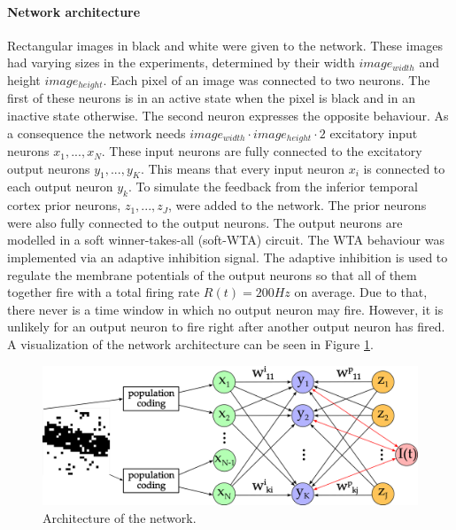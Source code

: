 \paragraph{Network architecture}
Rectangular images in black and white were given to the network. These images had varying sizes in the experiments, determined by their width $image_{width}$ and height $image_{height}$. Each pixel of an image was connected to two neurons. The first of these neurons is in an active state when the pixel is black and in an inactive state otherwise. The second neuron expresses the opposite behaviour. As a consequence the network needs $image_{width} \cdot image_{height} \cdot 2$ excitatory input neurons $x_1,...,x_N$. These input neurons are fully connected to the excitatory output neurons $y_1,...,y_K$. This means that every input neuron $x_i$ is connected to each output neuron $y_k$. 
To simulate the feedback from the inferior temporal cortex prior neurons, $z_1,...,z_J$, were added to the network. The prior neurons were also fully connected to the output neurons. The output neurons are modelled in a soft winner-takes-all (soft-WTA) circuit. The WTA behaviour was implemented via an adaptive inhibition signal. The adaptive inhibition is used to regulate the membrane potentials of the output neurons so that all of them together fire with a total firing rate $R(t) = 200 Hz$ on average. Due to that, there never is a time window in which no output neuron may fire. However, it is unlikely for an output neuron to fire right after another output neuron has fired. A visualization of the network architecture can be seen in Figure \ref{fig:networkArchitecture}.

\begin{figure}
  \label{fig:networkArchitecture}
  \includegraphics[width=\linewidth]{figures/networkPlan.png}
  \caption{Architecture of the network.}
\end{figure}

